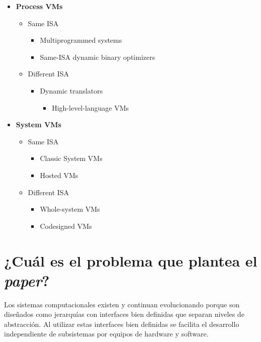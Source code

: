 \begin{minipage}{0.5\textwidth}
\begin{itemize}
    \item \textbf{Process VMs}
    \begin{itemize}
        \item Same ISA
        \begin{itemize}
            \item Multiprogrammed systems
            \item[] Same-ISA dynamic binary optimizers
        \end{itemize}
        \item Different ISA
        \begin{itemize}
            \item Dynamic translators
            \begin{itemize}
                \item[] High-level-language VMs
            \end{itemize}
        \end{itemize}
    \end{itemize}
\end{itemize}
\end{minipage}
\begin{minipage}{0.4\textwidth}
\begin{itemize}
    \item \textbf{System VMs}
    \begin{itemize}
        \item Same ISA
        \begin{itemize}
            \item Classic System VMs
            \item[] Hosted VMs
        \end{itemize}
        \item Different ISA
        \begin{itemize}
            \item Whole-system VMs
            \item[] Codesigned VMs
        \end{itemize}
    \end{itemize}
\end{itemize}
\end{minipage}


\section{¿Cuál es el problema que plantea el \textit{paper}?}
Los sistemas computacionales existen y continuan evolucionando porque son diseñados como jerarquías con interfaces bien definidas que separan niveles de abstracción. Al utilizar estas interfaces bien definidas se facilita el desarrollo independiente de subsistemas por equipos de hardware y software. 

